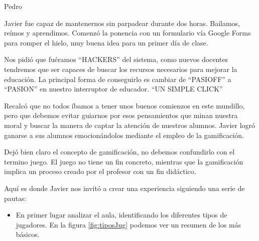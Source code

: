 \begin{opin}{\pedrocolor}{Pedro}
\begin{leftbar}{\pedrocolor}

Javier fue capaz de mantenernos  sin parpadear durante dos horas. Bailamos, reímos  y aprendimos. Comenzó la ponencia con un formulario vía Google Forms para romper el hielo, muy buena idea para un primer día de clase.

Nos pidió que fuéramos “HACKERS” del sistema, como nuevos docentes tendremos que ser capaces de buscar los recursos necesarios para mejorar la educación. La principal forma de conseguirlo es cambiar de “PASIOFF” a “PASION” en nuestro interruptor de educador. “UN SIMPLE CLICK”

Recalcó que no todos íbamos a tener unos buenos comienzos en este mundillo, pero que debemos evitar guiarnos por esos pensamientos que minan nuestra moral y buscar la manera de captar la atención de nuestros alumnos. Javier logró ganarse a sus alumnos emocionándolos mediante el empleo de la gamificación.

Dejó bien claro el concepto de gamificación, no debemos confundirlo con el termino juego. El juego no tiene un fin concreto, mientras que la gamificación implica un proceso creado por el profesor con un fin didáctico.

Aquí es donde Javier nos invitó a crear una experiencia siguiendo una serie de pautas:

\begin{itemize}

\item En primer lugar analizar el aula, identificando los diferentes tipos de jugadores. 
%
En la figura \ref{fig:tiposJug} podemos ver un resumen de los más básicos.


\end{itemize}
\end{leftbar}
\end{opin}
